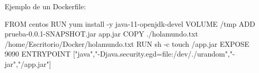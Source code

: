 \documentclass[
]{article}
\newenvironment{Shaded}{\begin{snugshade}}{\end{snugshade}}
\newcommand{\AttributeTok}[1]{\textcolor[rgb]{0.49,0.56,0.16}{#1}}
\newcommand{\ExtensionTok}[1]{#1}
\newcommand{\NormalTok}[1]{#1}
\newcommand{\StringTok}[1]{\textcolor[rgb]{0.25,0.44,0.63}{#1}}
\begin{document}
Ejemplo de un Dockerfile:

\begin{Shaded}
\begin{Highlighting}[]
\ExtensionTok{FROM}\NormalTok{ centos}
\ExtensionTok{RUN}\NormalTok{ yum install }\AttributeTok{{-}y}\NormalTok{ java{-}11{-}openjdk{-}devel}
\ExtensionTok{VOLUME}\NormalTok{ /tmp}
\ExtensionTok{ADD}\NormalTok{ prueba{-}0.0.1{-}SNAPSHOT.jar app.jar}
\ExtensionTok{COPY}\NormalTok{ ./holamundo.txt /home/Escritorio/Docker/holamundo.txt}
\ExtensionTok{RUN}\NormalTok{ sh }\AttributeTok{{-}c} \StringTok{\textquotesingle{}touch /app.jar\textquotesingle{}} 
\ExtensionTok{EXPOSE}\NormalTok{ 9090}
\ExtensionTok{ENTRYPOINT}\NormalTok{ [}\StringTok{"java"}\NormalTok{,}\StringTok{"{-}Djava.security.egd=file:/dev/./urandom"}\NormalTok{,}\StringTok{"{-}jar"}\NormalTok{,}\StringTok{"/app.jar"}\NormalTok{]}
\end{Highlighting}
\end{Shaded}
\end{document}
